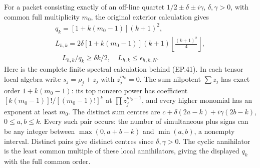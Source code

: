 For a packet consisting exactly of an off-line quartet
$1/2\pm\delta\pm i\gamma$, $\delta,\gamma>0$, with common full
multiplicity $m_0$, the original exterior calculation gives
\[
 \begin{gathered}
 q_k=[1+k(m_0-1)](k+1)^2,\\
 L_{h,k}=2\delta[1+k(m_0-1)](k+1)
       \left\lfloor\frac{(k+1)^2}{4}\right\rfloor,\\
 \quad L_{h,k}/q_k\ge\delta k/2,
 \quad L_{h,k}\le\epsilon_{h,k,N}.
 \end{gathered}\tag{EP.41}
\]
Here is the complete finite spectral calculation behind (EP.41).
In each tensor local algebra write $s_j=\rho_j+z_j$ with
$z_j^{m_0}=0$. The sum nilpotent $\sum z_j$ has exact order
$1+k(m_0-1)$: its top nonzero power has coefficient
$[k(m_0-1)]!/[(m_0-1)!]^k$ at $\prod z_j^{m_0-1}$, and every
higher monomial has an exponent at least $m_0$.
The distinct sum centres are
$c+\delta(2a-k)+i\gamma(2b-k)$, $0\le a,b\le k$.
Every such pair occurs: the number of simultaneous plus signs can
be any integer between $\max(0,a+b-k)$ and $\min(a,b)$, a nonempty
interval. Distinct pairs give distinct centres since $\delta,\gamma>0$.
The cyclic annihilator is the least common multiple of these local
annihilators, giving the displayed $q_k$ with the full common order.

